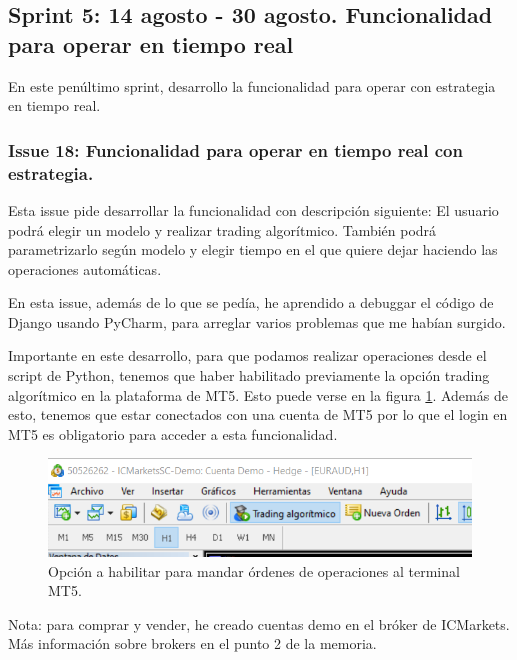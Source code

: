 \subsection{Sprint 5: 14 agosto - 30 agosto. Funcionalidad para operar en tiempo real}

En este penúltimo sprint, desarrollo la funcionalidad para operar con estrategia en tiempo real.

\subsubsection{Issue 18: Funcionalidad para operar en tiempo real con estrategia.}

Esta issue pide desarrollar la funcionalidad con descripción siguiente: El usuario podrá elegir un modelo y realizar trading algorítmico. También podrá parametrizarlo según modelo y elegir tiempo en el que quiere dejar haciendo las operaciones automáticas.\newline

En esta issue, además de lo que se pedía, he aprendido a debuggar el código de Django usando PyCharm, para arreglar varios problemas que me habían surgido.\newline

Importante en este desarrollo, para que podamos realizar operaciones desde el script de Python, tenemos que haber habilitado previamente la opción trading algorítmico en la plataforma de MT5. Esto puede verse en la figura \ref{boton_trading_algoritmico}. Además de esto, tenemos que estar conectados con una cuenta de MT5 por lo que el login en MT5 es obligatorio para acceder a esta funcionalidad. \newline

\begin{figure}[h]
	\includegraphics[width=1\textwidth]{imagenes/boton_trading_algoritmico.png}
	\caption{Opción a habilitar para mandar órdenes de operaciones al terminal MT5.} \label{boton_trading_algoritmico}
\end{figure}

Nota: para comprar y vender, he creado cuentas demo en el bróker de ICMarkets. Más información sobre brokers en el punto 2 de la memoria. \newline


